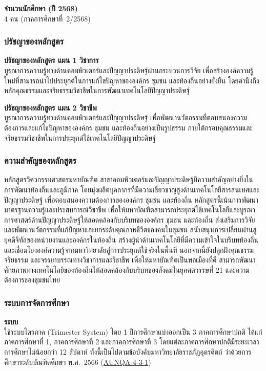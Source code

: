 \textbf{จำนวนนักศึกษา (ปี 2568)}\\
4 คน (ภาคการศึกษาที่~2/2568)


\subsubsection*{ปรัชญาของหลักสูตร}

\textbf{ปรัชญาของหลักสูตร แผน 1 วิชาการ}\\
บูรณาการความรู้ทางด้านคอมพิวเตอร์และปัญญาประดิษฐ์ผ่านกระบวนการวิจัย เพื่อสร้างองค์ความรู้ใหม่ที่สามารถนำไปประยุกต์ในการแก้ไขปัญหาขององค์กร ชุมชน และท้องถิ่นอย่างยั่งยืน โดยคำนึงถึงหลักคุณธรรมและจริยธรรมวิชาชีพในการพัฒนาเทคโนโลยีปัญญาประดิษฐ์

\textbf{ปรัชญาของหลักสูตร แผน 2 วิชาชีพ}\\
บูรณาการความรู้ทางด้านคอมพิวเตอร์และปัญญาประดิษฐ์ เพื่อพัฒนานวัตกรรมที่ตอบสนองความต้องการและแก้ไขปัญหาขององค์กร ชุมชน และท้องถิ่นอย่างเป็นรูปธรรม ภายใต้กรอบคุณธรรมและจริยธรรมวิชาชีพในการประยุกต์ใช้เทคโนโลยีปัญญาประดิษฐ์

\subsubsection*{ความสำคัญของหลักสูตร}

หลักสูตรวิศวกรรมศาสตรมหาบัณฑิต สาขาคอมพิวเตอร์และปัญญาประดิษฐ์มีความสำคัญอย่างยิ่งในการพัฒนาท้องถิ่นและภูมิภาค โดยมุ่งผลิตบุคลากรที่มีความเชี่ยวชาญสูงด้านเทคโนโลยีสารสนเทศและปัญญาประดิษฐ์ เพื่อตอบสนองความต้องการขององค์กร ชุมชน และท้องถิ่น หลักสูตรนี้เน้นการพัฒนามาตรฐานความรู้และประสบการณ์วิชาชีพ เพื่อให้มหาบัณฑิตสามารถประยุกต์ใช้เทคโนโลยีและบูรณาการศาสตร์ด้านปัญญาประดิษฐ์ให้สอดคล้องกับบริบทขององค์กร ชุมชน และท้องถิ่น ส่งเสริมการวิจัยและพัฒนานวัตกรรมที่แก้ปัญหาและยกระดับคุณภาพชีวิตของคนในชุมชน สนับสนุนการเปลี่ยนผ่านสู่ยุคดิจิทัลของหน่วยงานและองค์กรในท้องถิ่น สร้างผู้นำด้านเทคโนโลยีที่มีความเข้าใจในบริบทท้องถิ่น และเชื่อมโยงองค์ความรู้จากมหาวิทยาลัยสู่การประยุกต์ใช้จริงในพื้นที่ นอกจากนี้ยังปลูกฝังคุณธรรม จริยธรรม และจรรยาบรรณทางวิชาการและวิชาชีพ เพื่อให้มหาบัณฑิตเป็นพลเมืองที่ดี สามารถพัฒนาศักยภาพทางเทคโนโลยีของท้องถิ่นให้สอดคล้องกับบริบทของสังคมในยุคศตวรรษที่ 21 และความต้องการของชุมชนไทย

\subsubsection*{ระบบการจัดการศึกษา}

\textbf{ระบบ}\\
ใช้ระบบไตรภาค (Trimester System) โดย 1 ปีการศึกษาแบ่งออกเป็น 3 ภาคการศึกษาปกติ ได้แก่ ภาคการศึกษาที่ 1, ภาคการศึกษาที่ 2 และภาคการศึกษาที่ 3 โดยแต่ละภาคการศึกษาปกติมีระยะเวลาการศึกษาไม่น้อยกว่า 12 สัปดาห์ ทั้งนี้เป็นไปตามข้อบังคับมหาวิทยาลัยราชภัฏอุตรดิตถ์ ว่าด้วยการศึกษาระดับบัณฑิตศึกษา พ.ศ.~2566 (\hyperlink{ref:AUNQA-4-3-1}{AUNQA-4-3-1})

